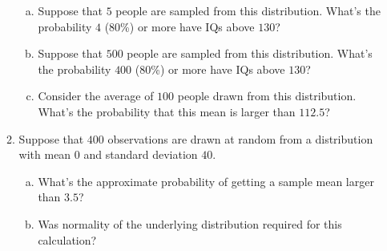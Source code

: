 \documentclass[12pt]{article}
\begin{document}
\begin{enumerate}[1.]
\begin{enumerate}[1.]
\begin{enumerate}[a.]
  \item Suppose that $5$ people are sampled from this distribution. 
    What's the probability $4$ (80\%) or more have IQs above $130$?
  \item Suppose that $500$ people are sampled from this distribution. 
    What's the probability $400$ (80\%) or more have IQs above $130$?
  \item Consider the average of $100$ people drawn from this
    distribution. What's the probability that this mean is larger
    than $112.5$?
  \end{enumerate}
\item  Suppose that $400$ observations are drawn at random
  from a distribution with mean $0$ and standard deviation $40$.
  \begin{enumerate}[a.]
  \item What's the approximate probability of getting a sample mean larger
    than $3.5$?
  \item Was normality of the underlying distribution required for this
    calculation?
  \end{enumerate}
\end{enumerate}


\end{enumerate}
\end{document}
